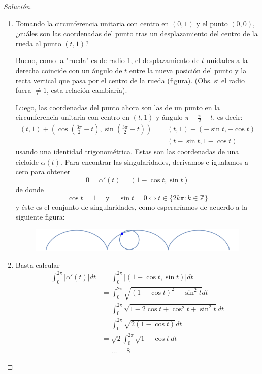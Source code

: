 \documentclass[spanish]{book}
\theoremstyle{definition}
\newcommand{\Z}{\mathbb{Z}}
\begin{document}
\begin{proof}[Solución]\leavevmode
	\begin{enumerate}
		\item Tomando la circunferencia unitaria con centro en $(0,1)$ y el punto $(0,0)$, ¿cuáles son las coordenadas del punto tras un desplazamiento del centro de la rueda al punto $(t,1)$?
		
		Bueno, como la "rueda" es de radio 1, el desplazamiento de $t$ unidades a la derecha coincide con un ángulo de $t$ entre la nueva posición del punto y la recta vertical que pasa por el centro de la rueda (figura). (Obs. si el radio fuera $\neq1$, esta relación cambiaría).
		
		Luego, las coordenadas del punto ahora son las de un punto en la circunferencia unitaria con centro en $(t,1)$ y ángulo $\pi+\frac{\pi}{2}-t$, es decir:
		\begin{align*}
			(t,1)+\left(\cos\left(\frac{3\pi}{2}-t\right),\sin\left(\frac{3\pi}{2}-t\right)\right)&=(t,1)+(-\sin{t},-\cos{t})\\
			&=(t-\sin{t},1-\cos{t})
		\end{align*}
		usando una identidad trigonométrica. Estas son las coordenadas de una cicloide $\alpha(t)$. Para encontrar las singularidades, derivamos e igualamos a cero para obtener
		\[0=\alpha'(t)=(1-\cos{t},\sin{t})\]
		de donde
		\[\cos{t}=1\quad\text{ y }\quad\sin{t}=0\iff t\in \{2k\pi:k\in\Z\}\]
		  y éste es el conjunto de singularidades, como esperaríamos de acuerdo a la siguiente figura:
		  \begin{figure}[H]
		  	\centering
		  	\includegraphics[width=\linewidth]{curvas1}
		  \end{figure}
		\item Basta calcular
		\begin{align*}
			\int_0^{2\pi}|\alpha'(t)|dt&=\int_0^{2\pi}|(1-\cos{t},\sin{t})|dt\\
			&=\int_0^{2\pi}\sqrt{(1-\cos{t})^2+\sin^2{t}}dt\\
			&=\int_0^{2\pi}\sqrt{1-2\cos{t}+\cos^2{t}+\sin^2{t}}dt\\
			&=\int_0^{2\pi}\sqrt{2(1-\cos{t})}dt\\
			&=\sqrt{2}\int_0^{2\pi}\sqrt{1-\cos{t}}dt\\
			&=\ldots=8
		\end{align*}
	\end{enumerate}
\end{proof}
\end{document}
